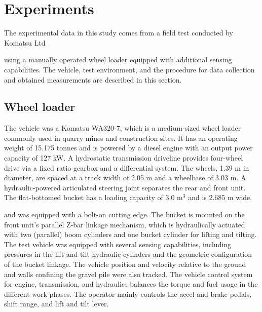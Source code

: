 \documentclass[10pt]{article}
\begin{document}
\section{Experiments}
\label{sec:experiment}

The experimental data in this study comes from a field test conducted by Komatsu Ltd
																																										
using a manually operated wheel loader equipped with additional sensing capabilities.
The vehicle, test environment, and the procedure for data collection and obtained 
measurements are described in this section.

\subsection{Wheel loader}
\label{sec:wheel-loader}
The vehicle was a Komatsu WA320-7, which is a medium-sized wheel loader commonly used 
in quarry mines and construction sites. It has an operating weight of 15.175 tonnes and is powered by a diesel engine with 
an output power capacity of 127 kW. A hydrostatic transmission driveline provides four-wheel drive via a 
fixed ratio gearbox and a differential system. The wheels, 1.39 m in 
diameter, are spaced at a track width of 2.05 m and a wheelbase of 3.03 m. 
A hydraulic-powered articulated steering joint separates the rear and front unit.
The flat-bottomed bucket has a loading capacity of 3.0 m$^3$ and is 2.685 m wide, 
																											 
and was equipped with a bolt-on cutting edge. The bucket is mounted on the front unit's parallel Z-bar linkage 
mechanism, which is hydraulically actuated with two (parallel) boom cylinders and one bucket 
cylinder for lifting and tilting. The test vehicle
was equipped with several sensing capabilities, including pressures in the lift and tilt hydraulic cylinders
and the geometric configuration of the bucket linkage.
The vehicle position and velocity
relative to the ground and walls confining the gravel pile were also tracked.
The vehicle control system for engine, transmission, and hydraulics balances the torque and fuel usage in the 
different work phases. The operator mainly controls the accel and brake pedals, shift range, and lift and tilt lever.
																	 
											  

																																																																																																																																   
									
\end{document}
